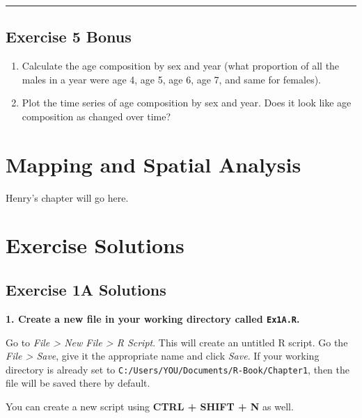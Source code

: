\documentclass[]{book}
\theoremstyle{definition}
\theoremstyle{definition}
\theoremstyle{definition}
\theoremstyle{remark}
\begin{document}
\begin{center}\rule{0.5\linewidth}{\linethickness}\end{center}

\section*{Exercise 5 Bonus}\label{exercise-5-bonus}

\begin{enumerate}
\def\labelenumi{\arabic{enumi}.}
\item
  Calculate the age composition by sex and year (what proportion of all
  the males in a year were age 4, age 5, age 6, age 7, and same for
  females).
\item
  Plot the time series of age composition by sex and year. Does it look
  like age composition as changed over time?
\end{enumerate}

\chapter{Mapping and Spatial Analysis}\label{ch6}

Henry's chapter will go here.

\chapter*{Exercise Solutions}\label{exercise-solutions}

\hypertarget{ex1a-answers}{\section*{Exercise 1A
Solutions}\label{ex1a-answers}}

\textbf{1. Create a new file in your working directory called
\texttt{Ex1A.R}.}

Go to \emph{File \textgreater{} New File \textgreater{} R Script}. This
will create an untitled R script. Go the \emph{File \textgreater{}
Save}, give it the appropriate name and click \emph{Save}. If your
working directory is already set to
\texttt{C:/Users/YOU/Documents/R-Book/Chapter1}, then the file will be
saved there by default.

You can create a new script using \textbf{CTRL + SHIFT + N} as well.
\end{document}
